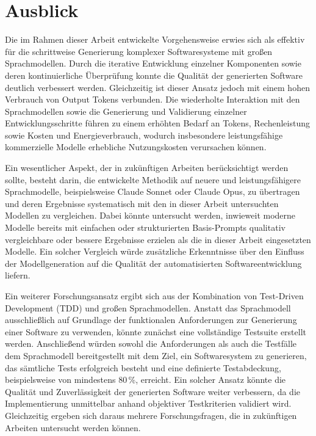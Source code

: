 \section{Ausblick}
Die im Rahmen dieser Arbeit entwickelte Vorgehensweise erwies sich als effektiv für die schrittweise Generierung komplexer Softwaresysteme mit großen Sprachmodellen. Durch die iterative Entwicklung einzelner Komponenten sowie deren kontinuierliche Überprüfung konnte die Qualität der generierten Software deutlich verbessert werden. Gleichzeitig ist dieser Ansatz jedoch mit einem hohen Verbrauch von Output Tokens verbunden. Die wiederholte Interaktion mit den Sprachmodellen sowie die Generierung und Validierung einzelner Entwicklungsschritte führen zu einem erhöhten Bedarf an Tokens, Rechenleistung sowie Kosten und Energieverbrauch, wodurch insbesondere leistungsfähige kommerzielle Modelle erhebliche Nutzungskosten verursachen können.

Ein wesentlicher Aspekt, der in zukünftigen Arbeiten berücksichtigt werden sollte, besteht darin, die entwickelte Methodik auf neuere und leistungsfähigere Sprachmodelle, beispielsweise Claude Sonnet oder Claude Opus, zu übertragen und deren Ergebnisse systematisch mit den in dieser Arbeit untersuchten Modellen zu vergleichen. Dabei könnte untersucht werden, inwieweit moderne Modelle bereits mit einfachen oder strukturierten Basis-Prompts qualitativ vergleichbare oder bessere Ergebnisse erzielen als die in dieser Arbeit eingesetzten Modelle. Ein solcher Vergleich würde zusätzliche Erkenntnisse über den Einfluss der Modellgeneration auf die Qualität der automatisierten Softwareentwicklung liefern.

Ein weiterer Forschungsansatz ergibt sich aus der Kombination von Test-Driven Development (TDD) und großen Sprachmodellen. Anstatt das Sprachmodell ausschließlich auf Grundlage der funktionalen Anforderungen zur Generierung einer Software zu verwenden, könnte zunächst eine vollständige Testsuite erstellt werden. Anschließend würden sowohl die Anforderungen als auch die Testfälle dem Sprachmodell bereitgestellt mit dem Ziel, ein Softwaresystem zu generieren, das sämtliche Tests erfolgreich besteht und eine definierte Testabdeckung, beispielsweise von mindestens 80\,\%, erreicht. Ein solcher Ansatz könnte die Qualität und Zuverlässigkeit der generierten Software weiter verbessern, da die Implementierung unmittelbar anhand objektiver Testkriterien validiert wird. Gleichzeitig ergeben sich daraus mehrere Forschungsfragen, die in zukünftigen Arbeiten untersucht werden können.

